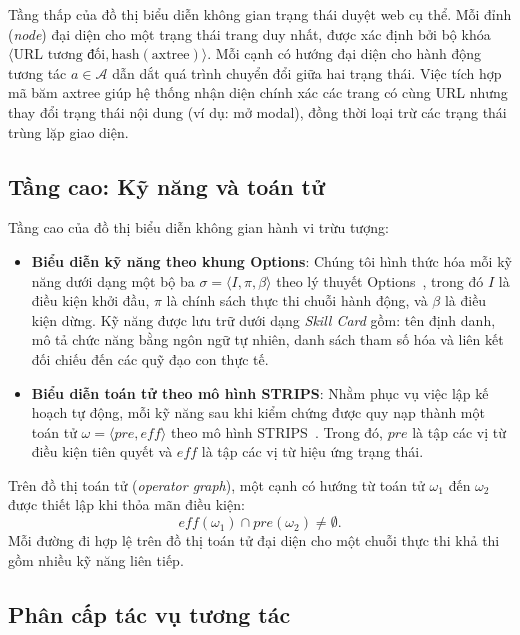 Tầng thấp của đồ thị biểu diễn không gian trạng thái duyệt web cụ thể. Mỗi đỉnh (\textit{node}) đại diện cho một trạng thái trang duy nhất, được xác định bởi bộ khóa $\langle \text{URL tương đối}, \text{hash}(\text{axtree}) \rangle$. Mỗi cạnh có hướng đại diện cho hành động tương tác $a \in \mathcal{A}$ dẫn dắt quá trình chuyển đổi giữa hai trạng thái. Việc tích hợp mã băm axtree giúp hệ thống nhận diện chính xác các trang có cùng URL nhưng thay đổi trạng thái nội dung (ví dụ: mở modal), đồng thời loại trừ các trạng thái trùng lặp giao diện.

\subsection{Tầng cao: Kỹ năng và toán tử}

Tầng cao của đồ thị biểu diễn không gian hành vi trừu tượng:
\begin{itemize}
  \item \textbf{Biểu diễn kỹ năng theo khung Options}: Chúng tôi hình thức hóa mỗi kỹ năng dưới dạng một bộ ba $\sigma = \langle I, \pi, \beta \rangle$ theo lý thuyết Options~\cite{sutton1999options}, trong đó $I$ là điều kiện khởi đầu, $\pi$ là chính sách thực thi chuỗi hành động, và $\beta$ là điều kiện dừng. Kỹ năng được lưu trữ dưới dạng \textit{Skill Card} gồm: tên định danh, mô tả chức năng bằng ngôn ngữ tự nhiên, danh sách tham số hóa và liên kết đối chiếu đến các quỹ đạo con thực tế.
  \item \textbf{Biểu diễn toán tử theo mô hình STRIPS}: Nhằm phục vụ việc lập kế hoạch tự động, mỗi kỹ năng sau khi kiểm chứng được quy nạp thành một toán tử $\omega = \langle \mathit{pre}, \mathit{eff} \rangle$ theo mô hình STRIPS~\cite{fikes1971strips}. Trong đó, $\mathit{pre}$ là tập các vị từ điều kiện tiên quyết và $\mathit{eff}$ là tập các vị từ hiệu ứng trạng thái.
\end{itemize}

Trên đồ thị toán tử (\textit{operator graph}), một cạnh có hướng từ toán tử $\omega_1$ đến $\omega_2$ được thiết lập khi thỏa mãn điều kiện:
\begin{equation}
  \mathit{eff}(\omega_1) \cap \mathit{pre}(\omega_2) \neq \emptyset.
\end{equation}
Mỗi đường đi hợp lệ trên đồ thị toán tử đại diện cho một chuỗi thực thi khả thi gồm nhiều kỹ năng liên tiếp.

\subsection{Phân cấp tác vụ tương tác}


